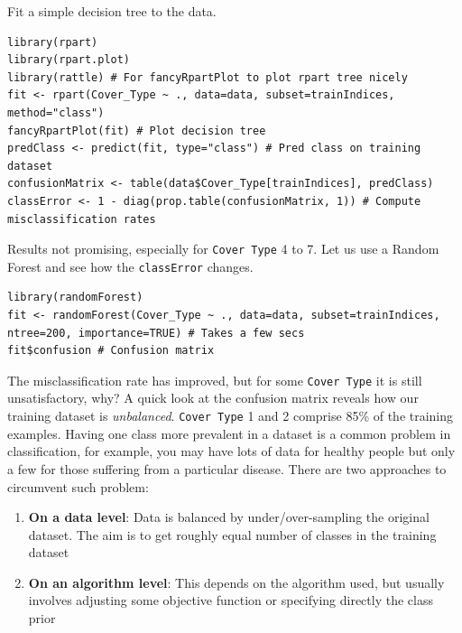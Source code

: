 \documentclass[a4paper,11pt]{article}
\begin{document}
Fit a simple decision tree to the data.
\\
\begin{lstlisting}[style=RCode]
library(rpart)
library(rpart.plot)
library(rattle) # For fancyRpartPlot to plot rpart tree nicely
fit <- rpart(Cover_Type ~ ., data=data, subset=trainIndices, method="class")
fancyRpartPlot(fit) # Plot decision tree
predClass <- predict(fit, type="class") # Pred class on training dataset
confusionMatrix <- table(data$Cover_Type[trainIndices], predClass)
classError <- 1 - diag(prop.table(confusionMatrix, 1)) # Compute misclassification rates
\end{lstlisting}

Results not promising, especially for \texttt{Cover Type} 4 to 7. Let
us use a Random Forest and see how the \texttt{classError} changes. 
\\
\begin{lstlisting}[style=RCode]
library(randomForest)
fit <- randomForest(Cover_Type ~ ., data=data, subset=trainIndices, ntree=200, importance=TRUE) # Takes a few secs
fit$confusion # Confusion matrix
\end{lstlisting}

The misclassification rate has improved, but for some \texttt{Cover Type} it is still unsatisfactory,
why? A quick look at the confusion matrix reveals how our training dataset is \textit{unbalanced}. 
\texttt{Cover Type} 1 and 2 comprise 85\% of the training examples. Having one class more prevalent
in a dataset is a common problem in classification, for example, you may have lots of data
for healthy people but only a few for those suffering from a particular disease. There are two
approaches to circumvent such problem:

\begin{enumerate}
	\item \textbf{On a data level}: Data is balanced by under/over-sampling the original dataset. The aim is to get roughly
	equal number of classes in the training dataset
	\item \textbf{On an algorithm level}: This depends on the algorithm used, but usually involves adjusting some objective function 
	or specifying directly the class prior
\end{enumerate}
\end{document}
